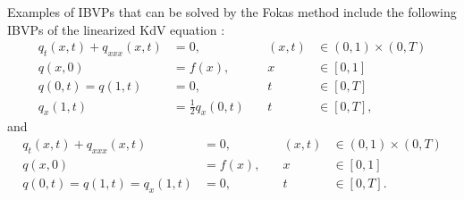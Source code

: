\documentclass[11pt, oneside, a4paper]{article}
\begin{document}
\noindent Examples of IBVPs that can be solved by the Fokas method include the following IBVPs of the linearized KdV equation \cite{Smith2016}:
\begin{subequations}\label{eq:problem_1}
    \begin{alignat}{3}
        q_t(x,t) + q_{xxx}(x,t) &= 0,\quad &(x,t)&\in (0,1)\times (0,T)\\
        q(x,0) &= f(x),\quad &x&\in [0,1]\\
        q(0,t) = q(1,t) &= 0, \quad &t&\in [0,T]\\
        q_x(1,t) &= \frac{1}{2}q_x(0,t)\quad &t&\in [0,T],
    \end{alignat}
\end{subequations}
and 
\begin{subequations}\label{eq:problem_2}
    \begin{alignat}{3}
        q_t(x,t) + q_{xxx}(x,t) &= 0,\quad &(x,t)&\in (0,1)\times (0,T)\\
        q(x,0) &= f(x),\quad &x&\in [0,1]\\
        q(0,t) = q(1,t) = q_x(1,t) &= 0, \quad &t&\in [0,T].
    \end{alignat}
\end{subequations}
\end{document}

